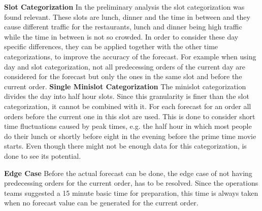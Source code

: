 \newline\newline\textbf{Slot Categorization}\newline
In the preliminary analysis the slot categorization was found relevant. These slots are lunch, dinner and the time in between and they cause different traffic for the restaurants, lunch and dinner being high traffic while the time in between is not so crowded. In order to consider these day specific differences, they can be applied together with the other time categorizations, to improve the accuracy of the forecast. For example when using day and slot categorization, not all predecessing orders of the current day are considered for the forecast but only the ones in the same slot and before the current order.
\newline\newline\textbf{Single Minislot Categorization}\newline
The minislot categorization divides the day into half hour slots. Since this granularity is finer than the slot categorization, it cannot be combined with it. For each forecast for an order all orders before the current one in this slot are used. This is done to consider short time fluctuations caused by peak times, e.g. the half hour in which most people do their lunch or shortly before eight in the evening before the prime time movie starts.\newline
Even though there might not be enough data for this categorization, is done to see its potential.

\newline\newline\textbf{Edge Case}\newline
Before the actual forecast can be done, the edge case of not having predecessing orders for the current order, has to be resolved. Since the operations teams suggested a 15 minute basic time for preparation, this time is always taken when no forecast value can be generated for the current order.
